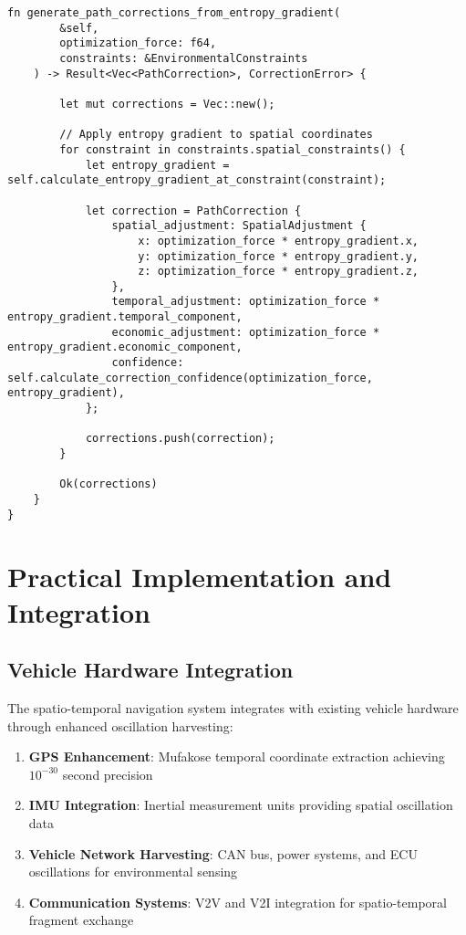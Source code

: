 \documentclass[12pt,a4paper]{article}
\begin{document}
\begin{lstlisting}[style=ruststyle, caption=Spatial Entropy Engineering Implementation]
    fn generate_path_corrections_from_entropy_gradient(
        &self,
        optimization_force: f64,
        constraints: &EnvironmentalConstraints
    ) -> Result<Vec<PathCorrection>, CorrectionError> {
        
        let mut corrections = Vec::new();
        
        // Apply entropy gradient to spatial coordinates
        for constraint in constraints.spatial_constraints() {
            let entropy_gradient = self.calculate_entropy_gradient_at_constraint(constraint);
            
            let correction = PathCorrection {
                spatial_adjustment: SpatialAdjustment {
                    x: optimization_force * entropy_gradient.x,
                    y: optimization_force * entropy_gradient.y,
                    z: optimization_force * entropy_gradient.z,
                },
                temporal_adjustment: optimization_force * entropy_gradient.temporal_component,
                economic_adjustment: optimization_force * entropy_gradient.economic_component,
                confidence: self.calculate_correction_confidence(optimization_force, entropy_gradient),
            };
            
            corrections.push(correction);
        }
        
        Ok(corrections)
    }
}
\end{lstlisting}

\section{Practical Implementation and Integration}

\subsection{Vehicle Hardware Integration}

The spatio-temporal navigation system integrates with existing vehicle hardware through enhanced oscillation harvesting:

\begin{enumerate}
\item \textbf{GPS Enhancement}: Mufakose temporal coordinate extraction achieving $10^{-30}$ second precision
\item \textbf{IMU Integration}: Inertial measurement units providing spatial oscillation data
\item \textbf{Vehicle Network Harvesting}: CAN bus, power systems, and ECU oscillations for environmental sensing
\item \textbf{Communication Systems}: V2V and V2I integration for spatio-temporal fragment exchange
\end{enumerate}
\end{document}
